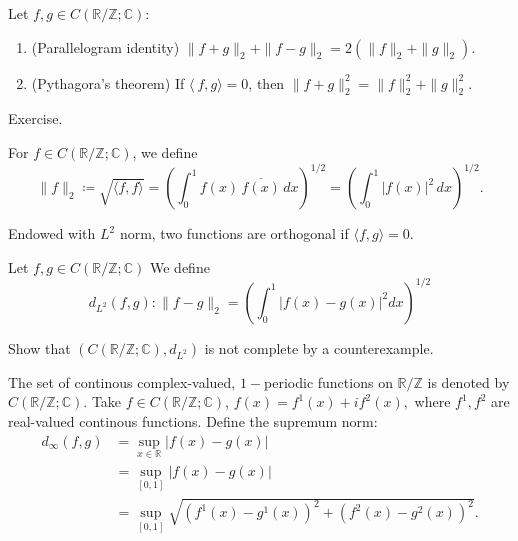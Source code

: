 \documentclass[12pt]{article}
\begin{document}
\begin{theorem}
    Let $f,g\in C(\mathbb{R}/\mathbb{Z}; \mathbb{C})$:
    \begin{enumerate}
        \item (Parallelogram identity) $\|f+g\|_{2} + \|f-g\|_{2} = 2(\|f\|_{2} + \|g\|_{2}).$
        \item (Pythagora's theorem) If $\langle\ f,g \rangle = 0$, then $\|f+g\|_{2}^2 = \|f\|_{2}^2 + \|g\|_{2}^2$.
    \end{enumerate}
\end{theorem}

\begin{pfbox}
    Exercise.
\end{pfbox}

\begin{definition}[$L^2$ Norm]
    For $f\in C(\mathbb{R}/\mathbb{Z}; \mathbb{C})$, we define
    \[
    \|f\|_{2} \coloneq \sqrt{\langle f,f\rangle}= \left(\int_0^1 f(x) \, \overline{f(x)} \, dx \right)^{1/2} = \left(\int_0^1 |f(x)|^2 \, dx\right)^{1/2}.
    \]
\end{definition}

\begin{remark}
    Endowed with $L^2$ norm, two functions are orthogonal if $\langle f,g\rangle=0$.
\end{remark}

\begin{definition}[$L^2$ metric]
    Let $f,g\in C(\mathbb{R}/\mathbb{Z}; \mathbb{C})$
    We define
    \[d_{L^2}(f,g):
    \|f-g\|_{2} = (\int_{0}^{1}|f(x)-g(x)|^2 dx)^{1/2}
    \]
\end{definition}

\begin{exercise}
    Show that $(C(\mathbb{R}/\mathbb{Z}; \mathbb{C}), d_{L^2})$ is not complete by a counterexample.
\end{exercise}


\begin{definition}
 The set of continous complex-valued, $1-$periodic functions on $\mathbb{R}/\mathbb{Z}$ is denoted by $C(\mathbb{R}/\mathbb{Z}; \mathbb{C})$.
 Take $f\in C(\mathbb{R}/\mathbb{Z}; \mathbb{C})$, $f(x)=f^1(x)+if^2(x),$ where $f^1, f^2$ are real-valued continous functions.
 Define the supremum norm:
 \begin{align*}
     d_\infty(f,g)&=\sup_{x\in\mathbb{R}}|f(x)-g(x)|\\
                  &=\sup_{[0,1]} |f(x)-g(x)|\\
                  &=\sup_{[0,1]}\sqrt{(f^1(x)-g^1(x))^2+(f^2(x)-g^2(x))^2}.
 \end{align*}

\end{definition}
\end{document}
